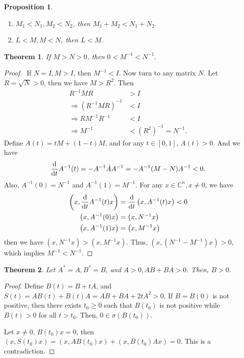 \documentclass[11pt]{book}
\newtheorem{theorem}{Theorem}[section]
\newtheorem{proposition}{Proposition}[section]
\theoremstyle{definition}
\numberwithin{equation}{subsection}
\begin{document}
\medskip

\begin{proposition}
~\begin{enumerate}[label=(\roman*)]
    \item $M_1 < N_1, M_2 < N_2$, then $M_1 + M_2 < N_1 + N_2$.
    \item $L < M, M < N$, then $L < M$.
\end{enumerate}
\end{proposition}

\medskip

\begin{theorem}
If $M > N > 0$, then $0 < M^{-1} < N^{-1}$.
\end{theorem}
\begin{proof}
${}$ \newline 
{} If $N = I, M > I$, then $M^{-1} < I$. Now turn to any matrix $N$. Let $R = \sqrt{N} > 0$, then we have $M > R^2$. Then
\begin{align*}
    R^{-1} M R & > I \\
    \Rightarrow \left(R^{-1} M R\right)^{-1} & < I \\
    \Rightarrow R M^{-1} R^{-1} & < I \\
    \Rightarrow M^{-1} & < \left(R^2\right)^{-1} = N^{-1}.
\end{align*}
 Define $A(t) = tM + (1-t)M$, and for any $t\in [0,1]$, $A(t) > 0$. And we have 
\begin{align*}
    \dv{}{t}A^{-1}(t) = - A^{-1} \dot{A} A^{-1} = - A^{-1} (M - N) A^{-1} < 0.
\end{align*}
Also, $A^{-1}(0) = N^{-1}$  and $A^{-1}(1) = M^{-1}$. For any $x\in \mathbb{C}^n, x\neq 0$, we have 
\begin{align*}
    \left(x, \dv{}{t}A^{-1}(t)x \right) & = \dv{}{t} \left(x, A^{-1}(t)x \right) < 0 \\
    \left(x, A^{-1}(0)x \right) & = \left(x, N^{-1}x \right) \\
    \left(x, A^{-1}(1)x \right) & = \left(x, M^{-1}x \right)
\end{align*}
then we have $\left(x, N^{-1}x \right) > \left(x, M^{-1}x \right)$. Thus, $\left(x, (N^{-1} - M^{-1})x \right) > 0$, which implies $M^{-1} < N^{-1}$.
\end{proof}

\medskip

\begin{theorem}
Let $A^* = A, B^* = B$, and $A > 0, AB + BA > 0$. Then, $B > 0$.
\end{theorem}
\begin{proof}
Define $B(t) = B + tA$, and $S(t) = AB(t) + B(t)A = AB + BA + 2t A^2 > 0$. If $B = B(0)$ is not positive, then there exists $t_0 \geq 0$ such that $B(t_0)$ is not positive while $B(t) > 0$ for all $t > t_0$. Then, $0 \in \sigma(B(t_0))$. 

Let $x \neq 0$, $B(t_0)x = 0$, then $(x, S(t_0)x) = (x, AB(t_0)x) + (x, B(t_0)Ax) = 0$. This is a contradiction.
\end{proof}
\end{document}
